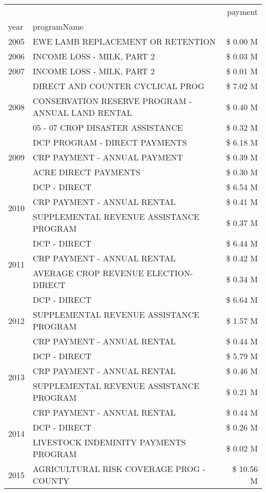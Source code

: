 \begin{tabular}{llr}
\toprule
 &  & payment \\
year & programName &  \\
\midrule
2005 & EWE LAMB REPLACEMENT OR RETENTION & \$ 0.00 M \\
\cline{1-3}
2006 & INCOME LOSS - MILK, PART 2 & \$ 0.03 M \\
\cline{1-3}
2007 & INCOME LOSS - MILK, PART 2 & \$ 0.01 M \\
\cline{1-3}
\multirow[t]{3}{*}{2008} & DIRECT AND COUNTER CYCLICAL PROG & \$ 7.02 M \\
 & CONSERVATION RESERVE PROGRAM - ANNUAL LAND RENTAL & \$ 0.40 M \\
 & 05 - 07 CROP DISASTER ASSISTANCE & \$ 0.32 M \\
\cline{1-3}
\multirow[t]{3}{*}{2009} & DCP PROGRAM - DIRECT PAYMENTS & \$ 6.18 M \\
 & CRP PAYMENT - ANNUAL PAYMENT & \$ 0.39 M \\
 & ACRE DIRECT PAYMENTS & \$ 0.30 M \\
\cline{1-3}
\multirow[t]{3}{*}{2010} & DCP - DIRECT & \$ 6.54 M \\
 & CRP PAYMENT - ANNUAL RENTAL & \$ 0.41 M \\
 & SUPPLEMENTAL REVENUE ASSISTANCE PROGRAM & \$ 0.37 M \\
\cline{1-3}
\multirow[t]{3}{*}{2011} & DCP - DIRECT & \$ 6.44 M \\
 & CRP PAYMENT - ANNUAL RENTAL & \$ 0.42 M \\
 & AVERAGE CROP REVENUE ELECTION-DIRECT & \$ 0.34 M \\
\cline{1-3}
\multirow[t]{3}{*}{2012} & DCP - DIRECT & \$ 6.64 M \\
 & SUPPLEMENTAL REVENUE ASSISTANCE PROGRAM & \$ 1.57 M \\
 & CRP PAYMENT - ANNUAL RENTAL & \$ 0.44 M \\
\cline{1-3}
\multirow[t]{3}{*}{2013} & DCP - DIRECT & \$ 5.79 M \\
 & CRP PAYMENT - ANNUAL RENTAL & \$ 0.46 M \\
 & SUPPLEMENTAL REVENUE ASSISTANCE PROGRAM & \$ 0.21 M \\
\cline{1-3}
\multirow[t]{3}{*}{2014} & CRP PAYMENT - ANNUAL RENTAL & \$ 0.44 M \\
 & DCP - DIRECT & \$ 0.26 M \\
 & LIVESTOCK INDEMINITY PAYMENTS PROGRAM & \$ 0.02 M \\
\cline{1-3}
\multirow[t]{3}{*}{2015} & AGRICULTURAL RISK COVERAGE PROG - COUNTY & \$ 10.56 M \\

\end{tabular}
